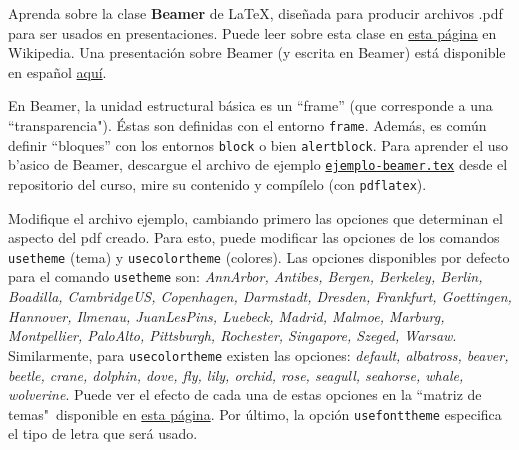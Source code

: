\documentclass[11pt]{exam}
\begin{document}
\firstpageheadrule
\runningheadrule
{}
\cfoot{ }
\begin{flushleft}
\vspace{0.2in}

\vspace{0.25cm}
\end{flushleft}

\begin{questions}

\item Aprenda sobre la clase \textbf{Beamer} de \LaTeX, diseñada para producir archivos .pdf para ser usados en presentaciones. Puede leer sobre esta clase en \href{https://es.wikipedia.org/wiki/Beamer}{esta página} en Wikipedia. Una presentación sobre Beamer (y escrita en Beamer) está disponible en español \href{http://metodos.fam.cie.uva.es/~latex/apuntes/apuntes13.pdf}{aqu\'i}.

\item En Beamer, la unidad estructural básica es un ``frame'' (que corresponde a una ``transparencia"). Éstas son definidas con el entorno \texttt{frame}. Además, es  común definir ``bloques'' con los entornos \texttt{block} o bien \texttt{alertblock}. Para aprender el uso b'asico de Beamer, descargue el archivo de ejemplo \href{https://github.com/gfrubi/CC/blob/master/guias/06/ejemplo-beamer.tex}{\texttt{ejemplo-beamer.tex}} desde el repositorio del curso, mire su contenido y compílelo (con \texttt{pdflatex}). 

\item Modifique el archivo ejemplo, cambiando primero las opciones que determinan el aspecto del pdf creado. Para esto, puede modificar las opciones de los comandos \texttt{usetheme} (tema) y \texttt{usecolortheme} (colores). Las opciones disponibles por defecto para el comando \texttt{usetheme} son: \textit{AnnArbor, Antibes, Bergen, Berkeley, Berlin, Boadilla, CambridgeUS, Copenhagen, Darmstadt,  Dresden, Frankfurt, Goettingen, Hannover, Ilmenau, JuanLesPins, Luebeck, Madrid, Malmoe, Marburg, Montpellier, PaloAlto, Pittsburgh, Rochester, Singapore, Szeged, Warsaw}. Similarmente, para \texttt{usecolortheme} existen las opciones: \textit{default, albatross, beaver, beetle, crane, dolphin, dove, fly, lily, orchid, rose, seagull, seahorse, whale, wolverine}. Puede ver el efecto de cada una de estas opciones en la ``matriz de temas"\, disponible en \href{https://hartwork.org/beamer-theme-matrix/}{esta p\'agina}. Por último, la opción \texttt{usefonttheme} especifica el tipo de letra que será usado.


\end{questions}
\end{document}
